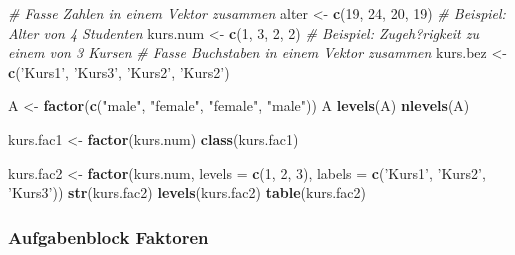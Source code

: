 \documentclass[]{article}
\newenvironment{Shaded}{\begin{snugshade}}{\end{snugshade}}
\newcommand{\KeywordTok}[1]{\textcolor[rgb]{0.13,0.29,0.53}{\textbf{#1}}}
\newcommand{\DataTypeTok}[1]{\textcolor[rgb]{0.13,0.29,0.53}{#1}}
\newcommand{\DecValTok}[1]{\textcolor[rgb]{0.00,0.00,0.81}{#1}}
\newcommand{\StringTok}[1]{\textcolor[rgb]{0.31,0.60,0.02}{#1}}
\newcommand{\CommentTok}[1]{\textcolor[rgb]{0.56,0.35,0.01}{\textit{#1}}}
\newcommand{\NormalTok}[1]{#1}
\begin{document}
\begin{Shaded}
\begin{Highlighting}[]
    \CommentTok{# Fasse Zahlen in einem Vektor zusammen}
\NormalTok{    alter    <-}\StringTok{ }\KeywordTok{c}\NormalTok{(}\DecValTok{19}\NormalTok{, }\DecValTok{24}\NormalTok{, }\DecValTok{20}\NormalTok{, }\DecValTok{19}\NormalTok{) }\CommentTok{# Beispiel: Alter von 4 Studenten}
\NormalTok{    kurs.num <-}\StringTok{ }\KeywordTok{c}\NormalTok{(}\DecValTok{1}\NormalTok{, }\DecValTok{3}\NormalTok{, }\DecValTok{2}\NormalTok{, }\DecValTok{2}\NormalTok{) }\CommentTok{# Beispiel: Zugeh?rigkeit zu einem von 3 Kursen}
    \CommentTok{# Fasse Buchstaben in einem Vektor zusammen}
\NormalTok{    kurs.bez <-}\StringTok{ }\KeywordTok{c}\NormalTok{(}\StringTok{'Kurs1'}\NormalTok{, }\StringTok{'Kurs3'}\NormalTok{, }\StringTok{'Kurs2'}\NormalTok{, }\StringTok{'Kurs2'}\NormalTok{)}

\NormalTok{    A <-}\StringTok{ }\KeywordTok{factor}\NormalTok{(}\KeywordTok{c}\NormalTok{(}\StringTok{"male"}\NormalTok{, }\StringTok{"female"}\NormalTok{, }\StringTok{"female"}\NormalTok{, }\StringTok{"male"}\NormalTok{))}
\NormalTok{    A}
    \KeywordTok{levels}\NormalTok{(A)}
    \KeywordTok{nlevels}\NormalTok{(A)}

\NormalTok{    kurs.fac1 <-}\StringTok{ }\KeywordTok{factor}\NormalTok{(kurs.num)}
    \KeywordTok{class}\NormalTok{(kurs.fac1)}

\NormalTok{    kurs.fac2 <-}\StringTok{ }\KeywordTok{factor}\NormalTok{(kurs.num, }
                        \DataTypeTok{levels =} \KeywordTok{c}\NormalTok{(}\DecValTok{1}\NormalTok{, }\DecValTok{2}\NormalTok{, }\DecValTok{3}\NormalTok{), }
                        \DataTypeTok{labels =} \KeywordTok{c}\NormalTok{(}\StringTok{'Kurs1'}\NormalTok{, }\StringTok{'Kurs2'}\NormalTok{, }\StringTok{'Kurs3'}\NormalTok{))}
    \KeywordTok{str}\NormalTok{(kurs.fac2)}
    \KeywordTok{levels}\NormalTok{(kurs.fac2)}
    \KeywordTok{table}\NormalTok{(kurs.fac2)}
\end{Highlighting}
\end{Shaded}

\subsubsection*{Aufgabenblock Faktoren}\label{aufgabenblock-faktoren}
\end{document}
